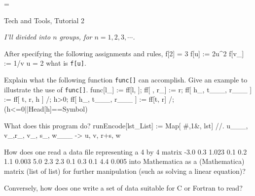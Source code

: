 \magnification=

\nopagenumbers

\centerline{\titlefont Tech and Tools, Tutorial 2}
\bigskip
\bigskip
{}
\bigskip
\bigskip
{\sl I'll divided into $n$ groups, for $n=1, 2, 3, \cdots$.}
\bigskip


\problem  After specifying the following assignments and rules,
\ttbg
f[2] = 3
f[u] := 2u^2
f[v_] := 1/v
u = 2
\tted
what is {\tt f[u]}.


\bigskip
\problem  Explain what the following function {\tt func[]} can 
accomplish. Give an example to illustrate the use of {\tt func[]}.
\ttbg
func[l_] := ff[l, {}];
ff[ {}, r_] := r;
ff[ {h_, t___}, {r___} ] := ff[ {t}, {r, h} ] /; h>0;
ff[ {h_, t___}, {r___} ] := ff[{t}, {r}] /; (h<=0||Head[h]==Symbol)
\tted

\bigskip
\problem What does this program do?
\ttbg
runEncode[lst_List] :=
  Map[ {#,1}&, lst] //. 
     {u___, {v_,r_}, {v_, s_}, w___} -> {u, {v, r+s}, w}
\tted


\bigskip
\problem How does one read a data file representing a 4 by 4 matrix
 -3.0 0.3  1.023
  0.1  0.2 1.1  0.003
  5.0  2.3 2.3  0.1
  0.3  0.1 4.4  0.005
\tted
into Mathematica as a (Mathematica) matrix (list of list) for further
manipulation (such as solving a linear equation)?

\item{} Conversely, how does one write a set of data suitable for C or Fortran
to read? 

\bye
